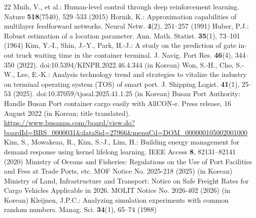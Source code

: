 \documentclass[a4paper]{llncs}
\begin{document}
\begin{thebibliography}{22}
 Mnih, V., et al.: Human-level control through deep reinforcement learning. Nature \textbf{518}(7540), 529--533 (2015)
 Hornik, K.: Approximation capabilities of multilayer feedforward networks. Neural Netw. \textbf{4}(2), 251--257 (1991)
 Huber, P.J.: Robust estimation of a location parameter. Ann. Math. Statist. \textbf{35}(1), 73--101 (1964)
 Kim, Y.-I., Shin, J.-Y., Park, H.-J.: A study on the prediction of gate in-out truck waiting time in the container terminal. J. Navig. Port Res. \textbf{46}(4), 344--350 (2022). doi:10.5394/KINPR.2022.46.4.344 (in Korean)
 Won, S.-H., Cho, S.-W., Lee, E.-K.: Analysis technology trend and strategies to vitalize the industry on terminal operating system (TOS) of smart port. J. Shipping Logist. \textbf{41}(1), 25--53 (2025). doi:10.37059/tjosal.2025.41.1.25 (in Korean)
 Busan Port Authority: Handle Busan Port container cargo easily with AllCON-e. Press release, 16 August 2022 (in Korean; title translated). \url{https://www.busanpa.com/board/view.do?boardId=BBS_0000031&dataSid=27966&menuCd=DOM_000000105002001000}
 Kim, S., Mowakeaa, R., Kim, S.-J., Lim, H.: Building energy management for demand response using kernel lifelong learning. IEEE Access \textbf{8}, 82131--82141 (2020)
 Ministry of Oceans and Fisheries: Regulations on the Use of Port Facilities and Fees at Trade Ports, etc. MOF Notice No. 2025-218 (2025) (in Korean)
 Ministry of Land, Infrastructure and Transport: Notice on Safe Freight Rates for Cargo Vehicles Applicable in 2026. MOLIT Notice No. 2026-402 (2026) (in Korean)
 Kleijnen, J.P.C.: Analyzing simulation experiments with common random numbers. Manag. Sci. \textbf{34}(1), 65--74 (1988)
\end{thebibliography}
\end{document}
